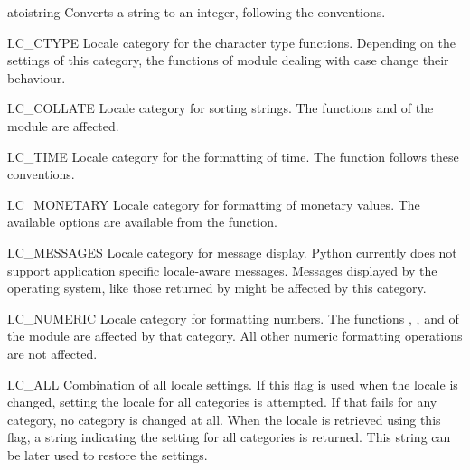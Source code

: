 \begin{funcdesc}{atoi}{string}
  Converts a string to an integer, following the
   conventions.
\end{funcdesc}

\begin{datadesc}{LC_CTYPE}
  Locale category for the character type functions.  Depending on the
  settings of this category, the functions of module
   dealing with case change their behaviour.
\end{datadesc}

\begin{datadesc}{LC_COLLATE}
  Locale category for sorting strings.  The functions
   and  of the
   module are affected.
\end{datadesc}

\begin{datadesc}{LC_TIME}
  Locale category for the formatting of time.  The function
   follows these conventions.
\end{datadesc}

\begin{datadesc}{LC_MONETARY}
  Locale category for formatting of monetary values.  The available
  options are available from the  function.
\end{datadesc}

\begin{datadesc}{LC_MESSAGES}
  Locale category for message display. Python currently does not
  support application specific locale-aware messages.  Messages
  displayed by the operating system, like those returned by
   might be affected by this category.
\end{datadesc}

\begin{datadesc}{LC_NUMERIC}
  Locale category for formatting numbers.  The functions
  , ,  and
   of the  module are affected by that
  category.  All other numeric formatting operations are not
  affected.
\end{datadesc}

\begin{datadesc}{LC_ALL}
  Combination of all locale settings.  If this flag is used when the
  locale is changed, setting the locale for all categories is
  attempted. If that fails for any category, no category is changed at
  all.  When the locale is retrieved using this flag, a string
  indicating the setting for all categories is returned. This string
  can be later used to restore the settings.
\end{datadesc}

